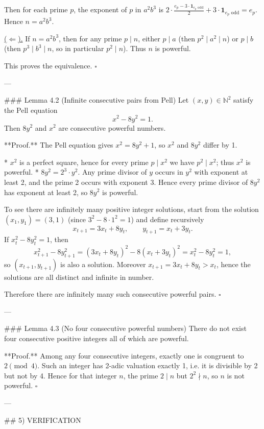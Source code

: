 Then for each prime \(p\), the exponent of \(p\) in \(a^2 b^3\) is
\(2\cdot\frac{e_p-3\cdot\mathbf 1_{e_p\text{ odd}}}{2} + 3\cdot\mathbf 1_{e_p\text{ odd}}=e_p\).
Hence \(n=a^2 b^3\).

\underline{(\(\Leftarrow\)).}
If \(n=a^2 b^3\), then for any prime \(p\mid n\), either \(p\mid a\) (then \(p^2\mid a^2\mid n\))
or \(p\mid b\) (then \(p^3\mid b^3\mid n\), so in particular \(p^2\mid n\)). Thus \(n\) is powerful.

This proves the equivalence. \(\square\)

---

### Lemma 4.2 (Infinite consecutive pairs from Pell)
Let \((x,y)\in\mathbb N^2\) satisfy the Pell equation
\[
 x^2-8y^2=1.
\]
Then \(8y^2\) and \(x^2\) are consecutive powerful numbers.

**Proof.** The Pell equation gives \(x^2=8y^2+1\), so \(x^2\) and \(8y^2\) differ by 1.

* \(x^2\) is a perfect square, hence for every prime \(p\mid x^2\) we have \(p^2\mid x^2\); thus \(x^2\)
  is powerful.
* \(8y^2 = 2^3\cdot y^2\). Any prime divisor of \(y\) occurs in \(y^2\) with exponent at least 2, and
  the prime 2 occurs with exponent 3. Hence every prime divisor of \(8y^2\) has exponent at least 2,
  so \(8y^2\) is powerful.

To see there are infinitely many positive integer solutions, start from the solution \((x_1,y_1)=(3,1)\)
(since \(3^2-8\cdot 1^2=1\)) and define recursively
\[
x_{t+1}=3x_t+8y_t,\qquad y_{t+1}=x_t+3y_t.
\]
If \(x_t^2-8y_t^2=1\), then
\[
x_{t+1}^2-8y_{t+1}^2=(3x_t+8y_t)^2-8(x_t+3y_t)^2=x_t^2-8y_t^2=1,
\]
so \((x_{t+1},y_{t+1})\) is also a solution. Moreover \(x_{t+1}=3x_t+8y_t>x_t\), hence the
solutions are all distinct and infinite in number.

Therefore there are infinitely many such consecutive powerful pairs. \(\square\)

---

### Lemma 4.3 (No four consecutive powerful numbers)
There do not exist four consecutive positive integers all of which are powerful.

**Proof.** Among any four consecutive integers, exactly one is congruent to \(2\pmod 4\).
Such an integer has 2-adic valuation exactly 1, i.e. it is divisible by 2 but not by 4.
Hence for that integer \(n\), the prime \(2\mid n\) but \(2^2\nmid n\), so \(n\) is not powerful.
\(\square\)

---

## 5) VERIFICATION

